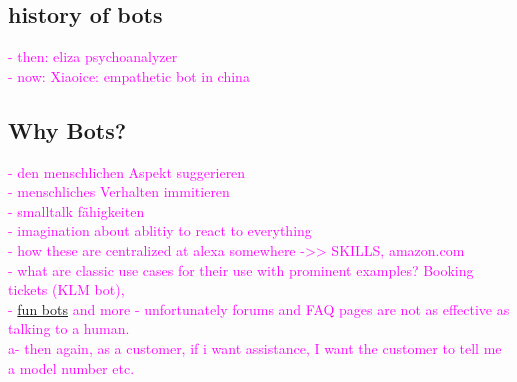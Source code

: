 \subsection{history of bots}
\textcolor{magenta}{
- then: eliza psychoanalyzer\\
- now: Xiaoice: empathetic bot in china\\
}
\subsection{Why Bots?}
\textcolor{magenta}{
- den menschlichen Aspekt suggerieren\cite{hiddenbrainpod}\\
- menschliches Verhalten immitieren\\
- smalltalk f\"ahigkeiten\\
- imagination about ablitiy to react to everything\\
- how these are centralized at alexa somewhere ->> SKILLS, amazon.com\\
- what are classic use cases for their use with prominent examples? Booking tickets (KLM bot),\\
- \href{https://www.forbes.com/sites/tomaslaurinavicius/2017/04/24/facebook-messenger-bots/\#4f61c16a66d8}{fun bots} and more
- unfortunately forums and FAQ pages are not as effective as talking to a human.\\ 
a- then again, as a customer, if i want assistance, I want the customer to tell me a model number etc.}
